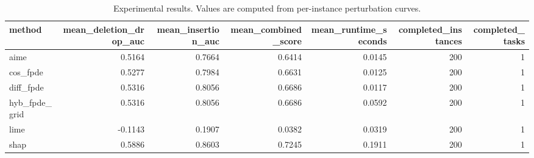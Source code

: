 \begin{table}[t]
\caption{Experimental results. Values are computed from per-instance perturbation curves.}
\label{tab:main_results_computed}
\centering
\begin{tabular}{lrrrrrr}
\toprule
method & mean\_deletion\_drop\_auc & mean\_insertion\_auc & mean\_combined\_score & mean\_runtime\_seconds & completed\_instances & completed\_tasks \\
\midrule
aime & 0.5164 & 0.7664 & 0.6414 & 0.0145 & 200 & 1 \\
cos\_fpde & 0.5277 & 0.7984 & 0.6631 & 0.0125 & 200 & 1 \\
diff\_fpde & 0.5316 & 0.8056 & 0.6686 & 0.0117 & 200 & 1 \\
hyb\_fpde\_grid & 0.5316 & 0.8056 & 0.6686 & 0.0592 & 200 & 1 \\
lime & -0.1143 & 0.1907 & 0.0382 & 0.0319 & 200 & 1 \\
shap & 0.5886 & 0.8603 & 0.7245 & 0.1911 & 200 & 1 \\
\bottomrule
\end{tabular}

\end{table}
